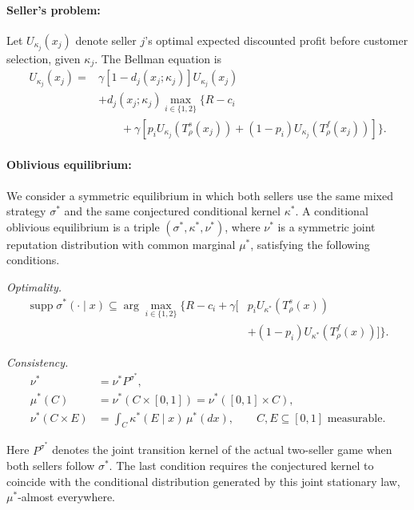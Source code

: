 \documentclass[11pt]{article}
\begin{document}
\paragraph{Seller's problem:}
Let $U_{\kappa_j}(x_j)$ denote seller $j$'s optimal expected
discounted profit before customer selection, given $\kappa_j$.
The Bellman equation is
\begin{equation}
\begin{aligned}
U_{\kappa_j}(x_j) ={}& \gamma[1-d_j(x_j;\kappa_j)]U_{\kappa_j}(x_j)\\
&+d_j(x_j;\kappa_j)\max_{i\in\{1,2\}}\Big\{R-c_i\\
&\qquad+\gamma\left[p_iU_{\kappa_j}(T_\rho^s(x_j))
+(1-p_i)U_{\kappa_j}(T_\rho^f(x_j))\right]\Big\}.
\end{aligned}
\end{equation}

\paragraph{Oblivious equilibrium:}
We consider a symmetric equilibrium in which both sellers
use the same mixed strategy $\sigma^*$ and the same
conjectured conditional kernel $\kappa^*$.
A conditional oblivious equilibrium is a triple
$(\sigma^*,\kappa^*,\nu^*)$, where $\nu^*$ is a symmetric
joint reputation distribution with common marginal $\mu^*$,
satisfying the following conditions.

\textit{Optimality.}
\begin{equation}
\begin{aligned}
\operatorname{supp}\sigma^*(\cdot\mid x)
\subseteq
\arg\max_{i\in\{1,2\}}
\Big\{
R-c_i
+\gamma\big[
&p_iU_{\kappa^*}(T_\rho^s(x))\\
&+(1-p_i)U_{\kappa^*}(T_\rho^f(x))
\big]
\Big\}.
\end{aligned}
\end{equation}

\textit{Consistency.}
\begin{equation}
\begin{aligned}
\nu^*&=\nu^*P^{\sigma^*},\\
\mu^*(C)&=\nu^*(C\times[0,1])
=\nu^*([0,1]\times C),\\
\nu^*(C\times E)
&=\int_C\kappa^*(E\mid x)\,\mu^*(dx),
\qquad C,E\subseteq[0,1]\text{ measurable}.
\end{aligned}
\end{equation}

Here $P^{\sigma^*}$ denotes the joint transition kernel
of the actual two-seller game when both sellers follow
$\sigma^*$. The last condition requires the conjectured
kernel to coincide with the conditional distribution
generated by this joint stationary law, $\mu^*$-almost
everywhere.
\end{document}
